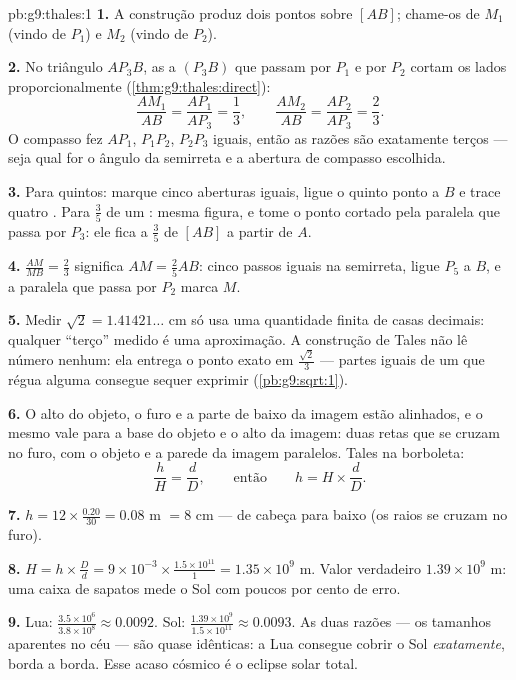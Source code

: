 \begin{solution}{pb:g9:thales:1}
\textbf{1.} A construção produz dois pontos sobre $[AB]$; chame-os de
$M_1$ (vindo de $P_1$) e $M_2$ (vindo de $P_2$).

\textbf{2.} No triângulo $A P_3 B$, as  a $(P_3 B)$ que passam
por $P_1$ e por $P_2$ cortam os lados proporcionalmente
(\cref{thm:g9:thales:direct}):
\[
\frac{A M_1}{AB} = \frac{A P_1}{A P_3} = \frac13,
\qquad
\frac{A M_2}{AB} = \frac{A P_2}{A P_3} = \frac23 .
\]
O compasso fez $A P_1$, $P_1 P_2$, $P_2 P_3$ iguais, então as razões
são exatamente terços --- seja qual for o ângulo da semirreta e a
abertura de compasso escolhida.

\textbf{3.} Para quintos: marque cinco aberturas iguais, ligue o quinto
ponto a $B$ e trace quatro . Para $\frac35$ de um :
mesma figura, e tome o ponto cortado pela paralela que passa por $P_3$:
ele fica a $\frac{3}{5}$ de $[AB]$ a partir de $A$.

\textbf{4.} $\frac{AM}{MB} = \frac23$ significa $AM = \frac25 AB$:
cinco passos iguais na semirreta, ligue $P_5$ a $B$, e a paralela que
passa por $P_2$ marca $M$.

\textbf{5.} Medir $\sqrt2 = 1.41421\ldots$ cm só usa uma quantidade
finita de casas decimais: qualquer ``terço'' medido é uma aproximação.
A construção de Tales não lê número nenhum: ela entrega o ponto exato
em $\frac{\sqrt2}{3}$ --- partes iguais de um  que régua alguma
consegue sequer exprimir (\cref{pb:g9:sqrt:1}).

\textbf{6.} O alto do objeto, o furo e a parte de baixo da imagem estão
alinhados, e o mesmo vale para a base do objeto e o alto da imagem:
duas retas que se cruzam no furo, com o objeto e a parede da imagem
paralelos. Tales na borboleta:
\[
\frac{h}{H} = \frac{d}{D},
\qquad\text{então}\qquad
h = H \times \frac dD .
\]

\textbf{7.} $h = 12 \times \frac{0.20}{30} = 0.08$ m $= 8$ cm --- de
cabeça para baixo (os raios se cruzam no furo).

\textbf{8.} $H = h \times \frac Dd = 9 \times 10^{-3} \times
\frac{1.5 \times 10^{11}}{1} = 1.35 \times 10^{9}$ m. Valor verdadeiro
$1.39 \times 10^9$ m: uma caixa de sapatos mede o Sol com poucos por
cento de erro.

\textbf{9.} Lua: $\frac{3.5 \times 10^6}{3.8 \times 10^8} \approx
0.0092$. Sol: $\frac{1.39 \times 10^9}{1.5 \times 10^{11}} \approx
0.0093$. As duas razões --- os tamanhos aparentes no céu --- são quase
idênticas: a Lua consegue cobrir o Sol \emph{exatamente}, borda a
borda. Esse acaso cósmico é o eclipse solar total.


\end{solution}
